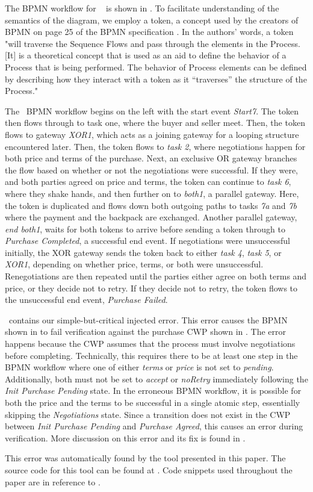 The BPMN workflow for \facetoface~ is shown in . To facilitate understanding of the semantics of the diagram, we employ a token, a concept used by the creators of BPMN on page 25 of the BPMN specification \cite{BPMNSpecification}. In the authors' words, a token "will traverse the Sequence Flows and pass through the elements in the Process. [It] is a theoretical concept that is used as an aid to define the behavior of a Process that is being performed. The behavior of Process elements can be defined by describing how they interact with a token as it “traverses” the structure of the Process."

The \facetoface~BPMN workflow begins on the left with the start event \emph{Start7}. The token then flows through to task one, where the buyer and seller meet. Then, the token flows to gateway \emph{XOR1}, which acts as a joining gateway for a looping structure encountered later. Then, the token flows to \emph{task 2}, where negotiations happen for both price and terms of the purchase. Next, an exclusive OR gateway branches the flow based on whether or not the negotiations were successful. If they were, and both parties agreed on price and terms, the token can continue to \emph{task 6}, where they shake hands, and then further on to \emph{both1}, a parallel gateway. Here, the token is duplicated and flows down both outgoing paths to tasks \emph{7a} and \emph{7b} where the payment and the backpack are exchanged. Another parallel gateway, \emph{end both1}, waits for both tokens to arrive before sending a token through to \emph{Purchase Completed}, a successful end event. If negotiations were unsuccessful initially, the XOR gateway sends the token back to either \emph{task 4}, \emph{task 5}, or \emph{XOR1}, depending on whether price, terms, or both were unsuccessful. Renegotiations are then repeated until the parties either agree on both terms and price, or they decide not to retry. If they decide not to retry, the token flows to the unsuccessful end event, \emph{Purchase Failed}.

\facetoface~contains our simple-but-critical injected error. This error causes the BPMN shown in  to fail verification against the purchase CWP shown in . The error happens because the CWP assumes that the process must involve negotiations before completing. Technically, this requires there to be at least one step in the BPMN workflow where one of either \emph{terms} or \emph{price} is not set to \emph{pending}. Additionally, both must not be set to \emph{accept} or \emph{noRetry} immediately following the \emph{Init Purchase Pending} state.  In the erroneous BPMN workflow, it is possible for both the price and the terms to be successful in a single atomic step, essentially skipping the \emph{Negotiations} state. Since a transition does not exist in the CWP between \emph{Init Purchase Pending} and \emph{Purchase Agreed}, this causes an error during verification. More discussion on this error and its fix is found in .

This error was automatically found by the tool presented in this paper. The source code for this tool can be found at \cite{sourceCode}. Code snippets used throughout the paper are in reference to \facetoface.
